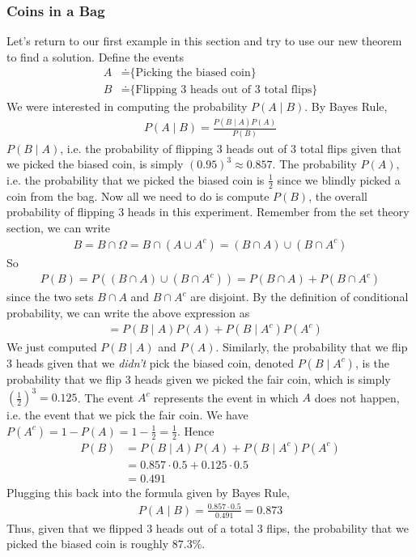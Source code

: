 \documentclass[11pt,letterpaper]{article}
\numberwithin{theorem}{section}
\numberwithin{definition}{section}
\numberwithin{lemma}{section}
\numberwithin{corollary}{section}
\numberwithin{proposition}{section}
\theoremstyle{definition}
\numberwithin{remark}{section}
\numberwithin{claim}{section}
\numberwithin{observation}{section}
\numberwithin{fact}{section}
\numberwithin{assumption}{section}
\numberwithin{example}{section}
\numberwithin{exercise}{section}
\begin{document}
\subsubsection{Coins in a Bag}
Let's return to our first example in this section and try to use our new theorem to find a solution. Define the events
\begin{align*}
A &\doteq \text{\{Picking the biased coin\}} \\
B &\doteq \text{\{Flipping 3 heads out of 3 total flips\}}
\end{align*}
We were interested in computing the probability $P(A \mid B)$. By Bayes Rule,
\begin{align*}
P(A \mid B) = \frac{P(B \mid A) P(A)}{P(B)}
\end{align*}
$P(B \mid A)$, i.e. the probability of flipping 3 heads out of 3 total flips given that we picked the biased coin, is simply $(0.95)^3 \approx 0.857$. The probability $P(A)$, i.e. the probability that we picked the biased coin is $\frac{1}{2}$ since we blindly picked a coin from the bag. Now all we need to do is compute $P(B)$, the overall probability of flipping 3 heads in this experiment. Remember from the set theory section, we can write
\begin{align*}
B = B \cap \Omega = B \cap (A \cup A^c) = (B \cap A) \cup (B \cap A^c)
\end{align*}
So
\begin{align*}
P(B) = P((B \cap A) \cup (B \cap A^c)) = P(B \cap A) + P(B \cap A^c)
\end{align*}
since the two sets $B \cap A$ and $B \cap A^c$ are disjoint. By the definition of conditional probability, we can write the above expression as
\begin{align*}
&= P(B \mid A) P(A) + P(B \mid A^c) P(A^c)
\end{align*}
We just computed $P(B \mid A)$ and $P(A)$. Similarly, the probability that we flip 3 heads given that we \textit{didn't} pick the biased coin, denoted $P(B \mid A^c)$, is the probability that we flip 3 heads given we picked the fair coin, which is simply $(\frac{1}{2})^3 = 0.125$. The event $A^c$ represents the event in which $A$ does not happen, i.e. the event that we pick the fair coin. We have $P(A^c) = 1 - P(A) = 1 - \frac{1}{2} = \frac{1}{2}$. Hence
\begin{align*}
P(B) &= P(B \mid A) P(A) + P(B \mid A^c) P(A^c) \\
&= 0.857 \cdot 0.5 + 0.125 \cdot 0.5 \\
&= 0.491
\end{align*}
Plugging this back into the formula given by Bayes Rule,
\begin{align*}
P(A \mid B) = \frac{0.857 \cdot 0.5}{0.491} = 0.873
\end{align*}
Thus, given that we flipped 3 heads out of a total 3 flips, the probability that we picked the biased coin is roughly $87.3\%$.
\end{document}
